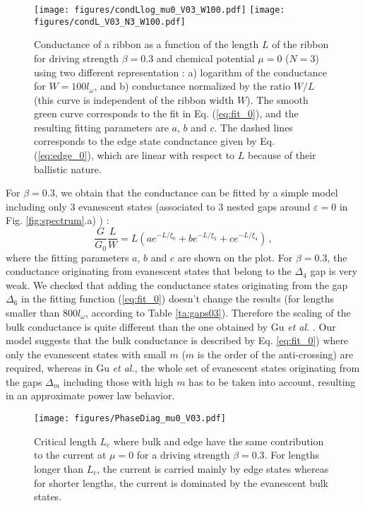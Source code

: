 \documentclass[aps,prb,showpacs,superscriptaddress,twocolumn,10pt,floatfix]{revtex4-1}
\newcommand{\ep}{\varepsilon}
\begin{document}
\begin{figure}[h!]
	\texttt{[image: figures/condLlog\_mu0\_V03\_W100.pdf]}
	\texttt{[image: figures/condL\_V03\_N3\_W100.pdf]}
	\caption{Conductance of a ribbon as a function of the length $L$ of the ribbon for driving strength $\beta=0.3$ and chemical potential $\mu=0$ ($N=3$) using two different representation : a) logarithm of the conductance for $W=100l_\omega$, and b) conductance normalized by the ratio $W/L$ (this curve is independent of the ribbon width $W$). The smooth green curve corresponds to the fit in Eq. (\ref{eq:fit_0}), and the resulting fitting parameters are $a$, $b$ and $c$. The dashed lines corresponds to the edge state conductance given by Eq. (\ref{eq:edge_0}), which are linear with respect to $L$ because of their ballistic nature.}
	\label{fig:condL_V03}
\end{figure}

For $\beta=0.3$, we obtain that the conductance can be fitted by a simple model including only 3 evanescent states (associated to 3 nested gaps around $\ep=0$ in Fig. \ref{fig:spectrum}.a) ) :
\begin{equation}
\frac{G}{G_0}\frac{L}{W} =L \left(  ae^{-L/\xi_0}+be^{-L/\xi_2}+ce^{-L/\xi_4}   \right) \, ,
\label{eq:fit_0}
\end{equation}
where the fitting parameters $a$, $b$ and $c$ are shown on the plot. For $\beta=0.3$, the conductance originating from evanescent states that belong to the $\Delta_4$ gap is very weak. We checked that adding the conductance states originating from the gap $\Delta_6$ in the fitting function (\ref{eq:fit_0}) doesn't change the results (for lengths smaller than $800l_\omega$, according to Table \ref{ta:gaps03}). Therefore the scaling of the bulk conductance is quite different than the one obtained by Gu {\it et al.} \cite{Gu2011}. Our model suggests that the bulk conductance is described by Eq. \ref{eq:fit_0}) where only the evanescent states with small $m$ ($m$ is the order of the anti-crossing) are required, whereas in Gu {\it et al.}, the whole set of evanescent states originating from the gaps $\Delta_m$ including those with high $m$ has to be taken into account, resulting in an approximate power law behavior\cite{Gu2011}.

\begin{figure}[h!]
	\texttt{[image: figures/PhaseDiag\_mu0\_V03.pdf]}
	\caption{Critical length $L_c$ where bulk and edge have the same contribution to the current at $\mu=0$ for a driving strength $\beta=0.3$. For lengths longer than $L_c$, the current is carried mainly by edge states whereas for shorter lengths, the current is dominated by the evanescent bulk states.}
	\label{fig:phase_diagV03}
\end{figure}
\end{document}
